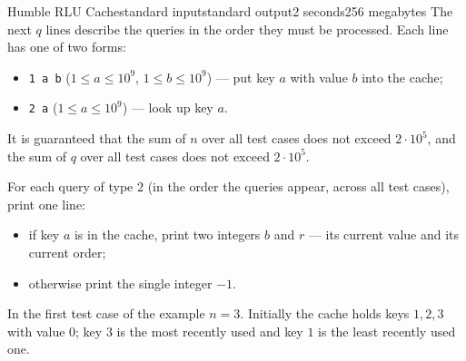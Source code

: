 \begin{problem}{Humble RLU Cache}{standard input}{standard output}{2 seconds}{256 megabytes}
The next $q$ lines describe the queries in the order they must be processed. Each line has one of two forms:

\begin{itemize}
  \item \texttt{1 a b} ($1 \le a \le 10^9$, $1 \le b \le 10^9$) --- put key $a$ with value $b$ into the cache;
  \item \texttt{2 a} ($1 \le a \le 10^9$) --- look up key $a$.
\end{itemize}

It is guaranteed that the sum of $n$ over all test cases does not exceed $2 \cdot 10^5$, and the sum of $q$ over all test cases does not exceed $2 \cdot 10^5$.


\OutputFile
For each query of type $2$ (in the order the queries appear, across all test cases), print one line:

\begin{itemize}
  \item if key $a$ is in the cache, print two integers $b$ and $r$ --- its current value and its current order;
  \item otherwise print the single integer $-1$.
\end{itemize}


\Example

\begin{example}
%
\end{example}

\Note
In the first test case of the example $n = 3$. Initially the cache holds keys $1, 2, 3$ with value $0$; key $3$ is the most recently used and key $1$ is the least recently used one.


\end{problem}
